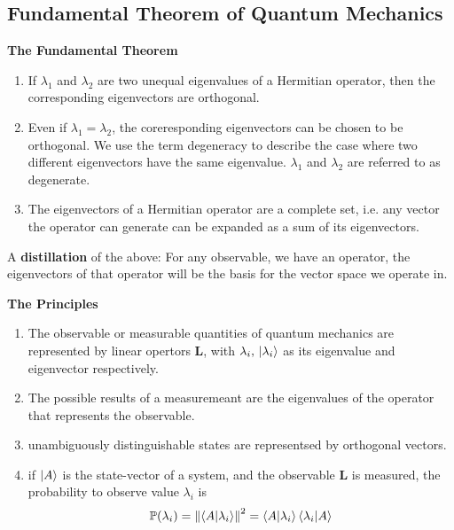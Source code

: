 \documentclass[a4paper]{article}
\begin{document}
\subsection{Fundamental Theorem of Quantum Mechanics}
\begin{flushleft}
    \textbf{The Fundamental Theorem}
\end{flushleft}
\begin{enumerate}
    \item If $\lambda_1$ and $\lambda_2$ are two unequal eigenvalues of a Hermitian operator, then the corresponding eigenvectors are orthogonal.
    \item Even if $\lambda_1 = \lambda_2$, the coreresponding eigenvectors can be chosen to be orthogonal. We use the term degeneracy to describe the case where two different eigenvectors have the same eigenvalue. $\lambda_1$ and $\lambda_2$ are referred to as degenerate.
    \item The eigenvectors of a Hermitian operator are a complete set, i.e. any vector the operator can generate can be expanded as a sum of its eigenvectors.
\end{enumerate}

\par A \textbf{distillation} of the above: For any observable, we have an operator, the eigenvectors of that operator will be the basis for the vector space we operate in.

\begin{flushleft}
    \textbf{The Principles}
\end{flushleft}
\begin{enumerate}
    \item The observable or measurable quantities of quantum mechanics are represented by linear opertors $\mathbf{L}$, with $\lambda_i,\, \ket{\lambda_i}$ as its eigenvalue and eigenvector respectively.
    \item The possible results of a measuremeant are the eigenvalues of the operator that represents the observable.
    \item unambiguously distinguishable states are representsed by orthogonal vectors.
    \item if $\ket{A}$ is the state-vector of a system, and the observable $\mathbf{L}$ is measured, the probability to observe value $\lambda_i$ is 
    \[
        \mathbb{P}(\lambda_i) = \norm{\bra{A}\ket{\lambda_i}}^2=\bra{A}\ket{\lambda_i}\bra{\lambda_i}\ket{A}    
    \]
\end{enumerate}
\end{document}
